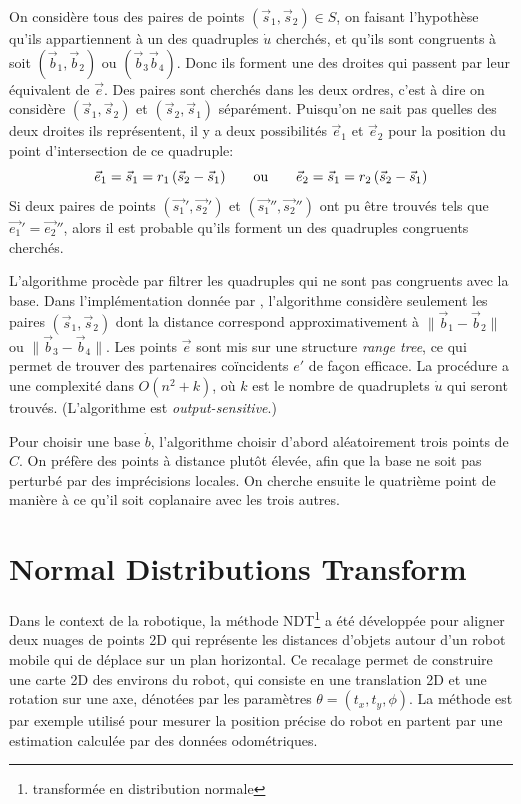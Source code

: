 \documentclass[a4paper,10pt]{scrreprt}
\begin{document}
On considère tous des paires de points $(\vec{s}_1, \vec{s}_2) \in S$, on faisant l'hypothèse qu'ils appartiennent à un des quadruples $\dot{u}$ cherchés, et qu'ils sont congruents à soit $(\vec{b}_1, \vec{b}_2)$ ou $(\vec{b}_3 \vec{b}_4)$. Donc ils forment une des droites qui passent par leur équivalent de $\vec{e}$. Des paires sont cherchés dans les deux ordres, c'est à dire on considère $(\vec{s}_1, \vec{s}_2)$ et $(\vec{s}_2, \vec{s}_1)$ séparément. Puisqu'on ne sait pas quelles des deux droites ils représentent, il y a deux possibilités $\vec{e}_1$ et $\vec{e}_2$ pour la position du point d'intersection de ce quadruple:
\begin{equation}
	\vec{e}_1 = \vec{s}_1 = r_1 \, (\vec{s}_2 - \vec{s}_1)
	\hspace{7mm} \text{ou} \hspace{7mm}
	\vec{e}_2 = \vec{s}_1 = r_2 \, (\vec{s}_2 - \vec{s}_1)	
\end{equation}
Si deux paires de points $(\vec{s_1}', \vec{s_2}')$ et $(\vec{s_1}'', \vec{s_2}'')$ ont pu être trouvés tels que $\vec{e_1}' = \vec{e_2}''$, alors il est probable qu'ils forment un des quadruples congruents cherchés.

L'algorithme procède par filtrer les quadruples qui ne sont pas congruents avec la base. Dans l'implémentation donnée par \cite{Aige2008}, l'algorithme considère seulement les paires $(\vec{s}_1, \vec{s}_2)$ dont la distance correspond approximativement à $\| \vec{b}_1 - \vec{b}_2 \|$ ou $\| \vec{b}_3 - \vec{b}_4 \|$. Les points $\vec{e}$ sont mis sur une structure \emph{range tree}, ce qui permet de trouver des partenaires coïncidents $e'$ de façon efficace. La procédure a une complexité dans $O(n^2 + k)$, où $k$ est le nombre de quadruplets $\dot{u}$ qui seront trouvés. (L'algorithme est \emph{output-sensitive}.)

Pour choisir une base $\dot{b}$, l'algorithme choisir d'abord aléatoirement trois points de $C$. On préfère des points à distance plutôt élevée, afin que la base ne soit pas perturbé par des imprécisions locales. On cherche ensuite le quatrième point de manière à ce qu'il soit coplanaire avec les trois autres.



\section{Normal Distributions Transform}
Dans le context de la robotique, la méthode NDT\footnote{transformée en distribution normale} a été développée pour aligner deux nuages de points 2D qui représente les distances d'objets autour d'un robot mobile qui de déplace sur un plan horizontal. \cite{Bibe2003} Ce recalage permet de construire une carte 2D des environs du robot, qui consiste en une translation 2D et une rotation sur une axe, dénotées par les paramètres $\theta = (t_x, t_y, \phi)$. La méthode est par exemple utilisé pour mesurer la position précise do robot en partent par une estimation calculée par des données odométriques.
\end{document}
